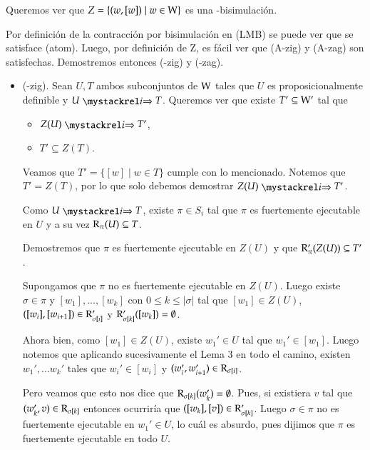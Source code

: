\begin{demostracion}
    Queremos ver que $Z = \{(w,[w]) \mid w \in \mathrm{W}\}$ es una \KHilogic-bisimulación.
    
    Por definición de la contracción por bisimulación en (LMB) se puede ver que se satisface (atom). Luego, por definición de Z, es fácil ver que (A-zig) y (A-zag) son satisfechas. Demostremos entonces (\KHilogic-zig) y (\KHilogic-zag).

    \begin{itemize}
        \item (\KHilogic-zig). Sean $U, T$ ambos subconjuntos de $\mathrm{W}$ tales que $U$ es proposicionalmente definible y $U \ultsExecAgi T$. Queremos ver que existe $T' \subseteq \mathrm{W}'$ tal que

        \begin{multicols}{2}
            \begin{itemize}
                \item $Z(U) \ultsExecAgi T'$, 
                \item $T' \subseteq Z(T)$.
            \end{itemize}
        \end{multicols}
        Veamos que $T' = \{[w] \mid w \in T\}$ cumple con lo mencionado. Notemos que $T' = Z(T)$, por lo que solo debemos demostrar $Z(U) \ultsExecAgi T'$.

        Como $U \ultsExecAgi T$, existe $\pi \in S_i$ tal que $\pi$ es fuertemente ejecutable en $U$ y a su vez $\mathrm{R}_\pi(U) \subseteq T$.

        Demostremos que $\pi$ es fuertemente ejecutable en $Z(U)$ y que $\mathrm{R}'_\pi(Z(U)) \subseteq T'$.

        Supongamos que $\pi$ no es fuertemente ejecutable en $Z(U)$. Luego existe $\sigma \in \pi$ y $[w_1],...,[w_k]$ con $0 \le k \le |\sigma|$ tal que $[w_1] \in Z(U)$, $([w_i], [w_{i+1}]) \in \mathrm{R}'_{\sigma[i]}$ y $\mathrm{R}'_{\sigma[k]}([w_k]) = \emptyset$.

        Ahora bien, como $[w_1] \in Z(U)$, existe $w_1' \in U$ tal que $w_1' \in [w_1]$. Luego notemos que aplicando sucesivamente el Lema 3 en todo el camino, existen $w_1',...w_k'$ tales que $w_i' \in [w_i]$ y $(w_i',w_{i+1}') \in \mathrm{R}_{\sigma[i]}$.

        Pero veamos que esto nos dice que $\mathrm{R}_{\sigma[k]}(w_k') = \emptyset$. Pues, si existiera $v$ tal que $(w_k',v) \in \mathrm{R}_{\sigma[k]}$ entonces ocurriría que $([w_k],[v]) \in \mathrm{R}'_{\sigma[k]}$. Luego $\sigma \in \pi$ no es fuertemente ejecutable en $w_1' \in U$, lo cuál es absurdo, pues dijimos que $\pi$ es fuertemente ejecutable en todo $U$.


\end{itemize}
\end{demostracion}
